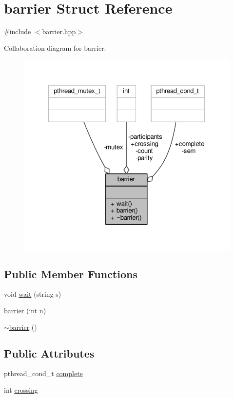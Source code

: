 \hypertarget{classbarrier}{\section{barrier Struct Reference}
\label{classbarrier}
}


{\ttfamily \#include $<$barrier.\-hpp$>$}



Collaboration diagram for barrier\-:
\nopagebreak
\begin{figure}[H]
\begin{center}
\leavevmode
\includegraphics[width=323pt]{classbarrier__coll__graph}
\end{center}
\end{figure}
\subsection*{Public Member Functions}
\begin{DoxyCompactItemize}
\item 
void \hyperlink{classbarrier_aac4de1181ab5851d0c3cb53d2d9274cf}{wait} (string s)
\item 
\hyperlink{classbarrier_a5d4bc9244f928a43d678479b7701474f}{barrier} (int n)
\item 
\hyperlink{classbarrier_a0bab55c08d3796a01333400ae39661ff}{$\sim$barrier} ()
\end{DoxyCompactItemize}
\subsection*{Public Attributes}
\begin{DoxyCompactItemize}
\item 
pthread\-\_\-cond\-\_\-t \hyperlink{classbarrier_aaccb992b02c15e2d52172f23ef789e84}{complete}
\item 
int \hyperlink{classbarrier_a861ba134352ae347a74209ee9c4c5ae4}{crossing}
\end{DoxyCompactItemize}
